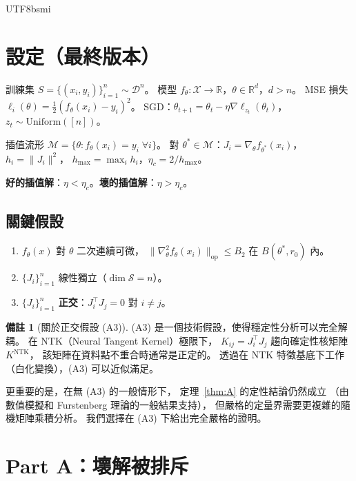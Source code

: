 \documentclass[11pt,a4paper]{article}
\theoremstyle{definition}
\newtheorem{remark}[theorem]{備註}
\newcommand{\R}{\mathbb{R}}
\newcommand{\cM}{\mathcal{M}}
\newcommand{\cS}{\mathcal{S}}
\newcommand{\cX}{\mathcal{X}}
\newcommand{\cD}{\mathcal{D}}
\begin{document}
\begin{CJK}{UTF8}{bsmi}
\section{設定（最終版本）}
\label{sec:setup-final}

訓練集 $S=\{(x_i,y_i)\}_{i=1}^n \sim \cD^n$。
模型 $f_\theta:\cX\to\R$，$\theta\in\R^d$，$d>n$。
MSE 損失 $\ell_i(\theta)=\frac{1}{2}(f_\theta(x_i)-y_i)^2$。
SGD：$\theta_{t+1}=\theta_t-\eta\nabla\ell_{z_t}(\theta_t)$，$z_t\sim\mathrm{Uniform}([n])$。

插值流形 $\cM=\{\theta:f_\theta(x_i)=y_i\;\forall i\}$。
對 $\theta^*\in\cM$：$J_i=\nabla_\theta f_{\theta^*}(x_i)$，$h_i=\|J_i\|^2$，
$h_{\max}=\max_i h_i$，$\eta_c=2/h_{\max}$。

\textbf{好的插值解}：$\eta<\eta_c$。\textbf{壞的插值解}：$\eta>\eta_c$。

\subsection*{關鍵假設}

\begin{enumerate}
  \item[(A1)] $f_\theta(x)$ 對 $\theta$ 二次連續可微，
    $\|\nabla^2_\theta f_\theta(x_i)\|_{\mathrm{op}}\leq B_2$ 在 $B(\theta^*,r_0)$ 內。
  \item[(A2)] $\{J_i\}_{i=1}^n$ 線性獨立（$\dim\cS=n$）。
  \item[(A3)] $\{J_i\}_{i=1}^n$ \textbf{正交}：$J_i^\top J_j=0$ 對 $i\neq j$。
\end{enumerate}

\begin{remark}[關於正交假設 (A3)]
  (A3) 是一個技術假設，使得穩定性分析可以完全解耦。
  在 NTK（Neural Tangent Kernel）極限下，
  $K_{ij}=J_i^\top J_j$ 趨向確定性核矩陣 $K^{\mathrm{NTK}}$，
  該矩陣在資料點不重合時通常是正定的。
  透過在 NTK 特徵基底下工作（白化變換），(A3) 可以近似滿足。

  更重要的是，在無 (A3) 的一般情形下，
  定理~\ref{thm:A} 的定性結論仍然成立
  （由數值模擬和 Furstenberg 理論的一般結果支持），
  但嚴格的定量界需要更複雜的隨機矩陣乘積分析。
  我們選擇在 (A3) 下給出完全嚴格的證明。
\end{remark}

\section{Part A：壞解被排斥}


\end{CJK}
\end{document}
